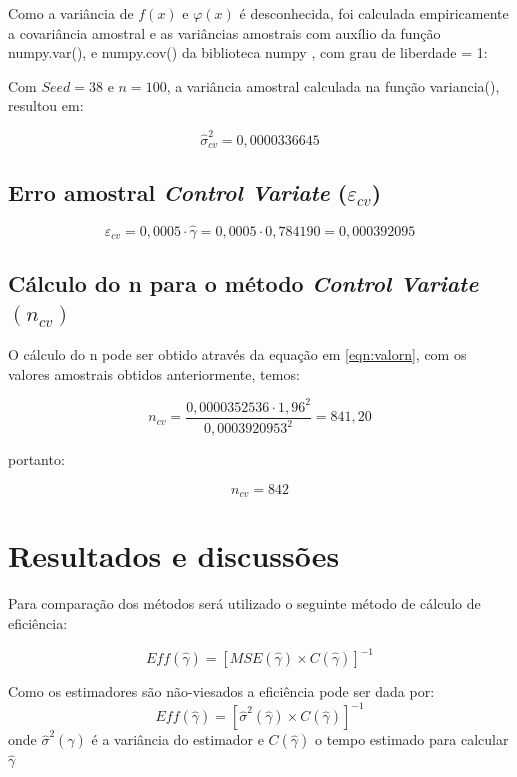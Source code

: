 \documentclass{article}
\begin{document}
Como a variância de $f(x)$ e $\varphi(x)$ é desconhecida, foi calculada empiricamente a covariância amostral e as variâncias amostrais com auxílio da função numpy.var(), e numpy.cov() da biblioteca numpy \cite{harris2020array}, com grau de liberdade = 1:

Com $Seed=38$ e $n=100$, a variância amostral calculada na função variancia(), resultou em:

\[
    \hat{\sigma}_{cv}^2 = 0,0000336645
\]

\subsection{Erro amostral \textit{Control Variate} ($\varepsilon_{cv}$)}

\begin{equation*}
    \varepsilon_{cv} = 0,0005\cdot\hat{\gamma} = 0,0005\cdot0,784190 = 0,000392095
\end{equation*}

\subsection{Cálculo do n para o método \textit{Control Variate} $(n_{cv})$}

O cálculo do n pode ser obtido através da equação em \ref{eqn:valorn}, com os valores amostrais obtidos anteriormente, temos:

\begin{equation*}
    n_{cv} = \frac{0,0000352536\cdot1,96^2}{0,0003920953^2} = 841,20
\end{equation*}

portanto:

\[
    n_{cv} = 842
\]


\section{Resultados e discussões}

Para comparação dos métodos será utilizado o seguinte método de cálculo de eficiência: \cite{MCandQMCsampling}

\begin{equation*}
    Eff(\hat{\gamma}) = [MSE(\hat{\gamma}) \times C(\hat{\gamma})]^{-1} 
\end{equation*}

Como os estimadores são não-viesados a eficiência pode ser dada por:
\begin{equation*}
    Eff(\hat{\gamma}) = [{\hat{\sigma}}^2(\hat{\gamma}) \times C(\hat{\gamma})]^{-1}
\end{equation*}
onde ${\hat{\sigma}^2}(\hat{\gamma})$ é a variância do estimador e $C(\hat{\gamma})$ o tempo estimado para calcular $\hat{\gamma}$
\end{document}

